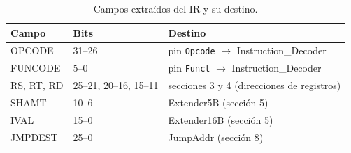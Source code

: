 \documentclass[11pt,a4paper]{article}
\newcommand{\sig}[1]{\texttt{#1}}
\begin{document}
\begin{table}[H]
\centering
\small
\begin{tabular}{lll}
\toprule
Campo & Bits & Destino\\
\midrule
OPCODE & 31--26 & pin \sig{Opcode} $\to$ Instruction\_Decoder\\
FUNCODE & 5--0 & pin \sig{Funct} $\to$ Instruction\_Decoder\\
RS, RT, RD & 25--21, 20--16, 15--11 & secciones 3 y 4 (direcciones de registros)\\
SHAMT & 10--6 & Extender5B (secci\'on 5)\\
IVAL & 15--0 & Extender16B (secci\'on 5)\\
JMPDEST & 25--0 & JumpAddr (secci\'on 8)\\
\bottomrule
\end{tabular}
\caption{Campos extra\'idos del IR y su destino.}
\label{tab:campos}
\end{table}
\end{document}
